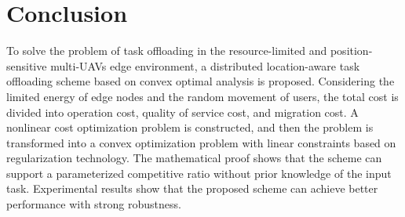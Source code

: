 \documentclass[journal,article,submit,pdftex,moreauthors]{Definitions/mdpi}
\begin{document}



\section{Conclusion}
To solve the problem of task offloading in the resource-limited and position-sensitive multi-UAVs edge environment, a distributed location-aware task offloading  scheme based on convex optimal analysis is proposed. Considering the limited energy of edge nodes and the random movement of users, the total cost is divided into operation cost, quality of service cost, and migration cost. A nonlinear cost optimization problem is constructed, and then the problem is transformed into a convex optimization problem with linear constraints based on regularization technology. The mathematical proof shows that the scheme can support a parameterized competitive ratio without prior knowledge of the input task. Experimental results show that the proposed scheme can achieve  better performance with strong robustness.


\vspace{6pt} 




\end{document}
